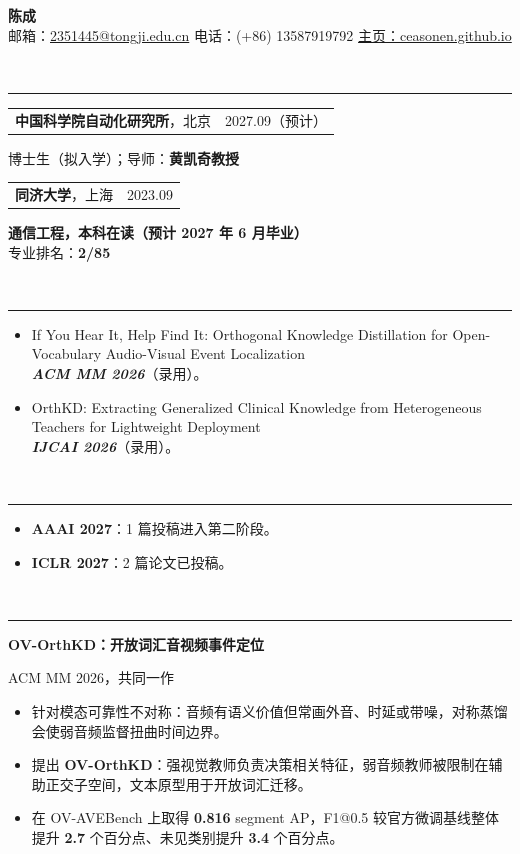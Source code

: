 \documentclass[10pt]{article}
\newcommand{\cvsection}[1]{%
  \par\vspace{1pt}%
  \noindent{\large\bfseries #1}\\[-4.5pt]%
  \noindent\rule{\textwidth}{0.4pt}\par\vspace{0pt}%
}
\newcommand{\researchblock}[3]{%
  \textbf{#1}\par
  #2\par
  \begin{itemize}#3\end{itemize}%
}
\begin{document}
\begin{center}
{\LARGE\bfseries 陈成}\\[4pt]
邮箱：\href{mailto:2351445@tongji.edu.cn}{2351445@tongji.edu.cn} \textbar{}
电话：(+86) 13587919792 \textbar{}
\href{https://ceasonen.github.io}{主页：ceasonen.github.io}
\end{center}
\vspace{-2pt}
\cvsection{教育背景}
\noindent\begin{tabularx}{\textwidth}{@{}Xr@{}}
  \textbf{中国科学院自动化研究所}，北京 & 2027.09（预计） \\
\end{tabularx}\vspace{-2pt}
博士生（拟入学）；导师：\textbf{黄凯奇教授}\\
\noindent\begin{tabularx}{\textwidth}{@{}Xr@{}}
  \textbf{同济大学}，上海 & 2023.09 \textendash 2027.06 \\
\end{tabularx}\vspace{-2pt}
\textbf{通信工程，本科在读（预计 2027 年 6 月毕业）}\\
专业排名：\textbf{2/85}
\cvsection{发表论文}
\begin{itemize}
  \item If You Hear It, Help Find It: Orthogonal Knowledge Distillation for Open-Vocabulary Audio-Visual Event Localization\\
  \textbf{\textit{ACM MM 2026}}（录用）。
  \item OrthKD: Extracting Generalized Clinical Knowledge from Heterogeneous Teachers for Lightweight Deployment\\
  \textbf{\textit{IJCAI 2026}}（录用）。
\end{itemize}
\cvsection{投稿进展}
\begin{itemize}
  \item \textbf{AAAI 2027}：1 篇投稿进入第二阶段。
  \item \textbf{ICLR 2027}：2 篇论文已投稿。
\end{itemize}
\cvsection{科研经历}
\researchblock{OV-OrthKD：开放词汇音视频事件定位}{ACM MM 2026，共同一作}{
  \item 针对模态可靠性不对称：音频有语义价值但常画外音、时延或带噪，对称蒸馏会使弱音频监督扭曲时间边界。
  \item 提出 \textbf{OV-OrthKD}：强视觉教师负责决策相关特征，弱音频教师被限制在辅助正交子空间，文本原型用于开放词汇迁移。
  \item 在 OV-AVEBench 上取得 \textbf{0.816} segment AP，F1@0.5 较官方微调基线整体提升 \textbf{2.7} 个百分点、未见类别提升 \textbf{3.4} 个百分点。
}
\end{document}
